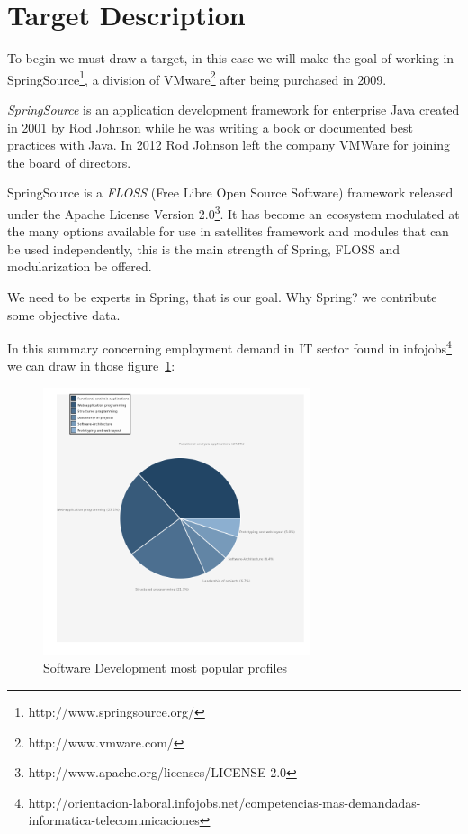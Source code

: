 \documentclass[11pt]{scrartcl}
\begin{document}
\section{Target Description}

\par To begin we must draw a target, in this case we will make the goal of working in SpringSource\footnote{http://www.springsource.org/}, a division of VMware\footnote{http://www.vmware.com/} after being purchased in 2009.

\par \emph{SpringSource} is an application development framework for enterprise Java created in 2001 by Rod Johnson while he was writing a book or documented best practices with Java. In 2012 Rod Johnson left the company VMWare for joining the board of directors.

\par SpringSource is a \emph{FLOSS} (Free Libre Open Source Software) framework released under the Apache License Version 2.0\footnote{http://www.apache.org/licenses/LICENSE-2.0}. It has become an ecosystem modulated at the many options available for use in satellites framework and modules that can be used independently, this is the main strength of Spring, FLOSS and modularization be offered.

\par We need to be experts in Spring, that is our goal. Why Spring? we contribute some objective data.

\par In this summary concerning employment demand in IT sector found in infojobs\footnote{http://orientacion-laboral.infojobs.net/competencias-mas-demandadas-informatica-telecomunicaciones} we can draw in those figure~\ref{fig:req-profiles}:

\begin{figure}[H]
\begin{center}
  \includegraphics[width=0.7\textwidth]{images/requested-profiles-piechart.png}
  \caption{Software Development most popular profiles}
  \label{fig:req-profiles}
\end{center}
\end{figure}
\end{document}
